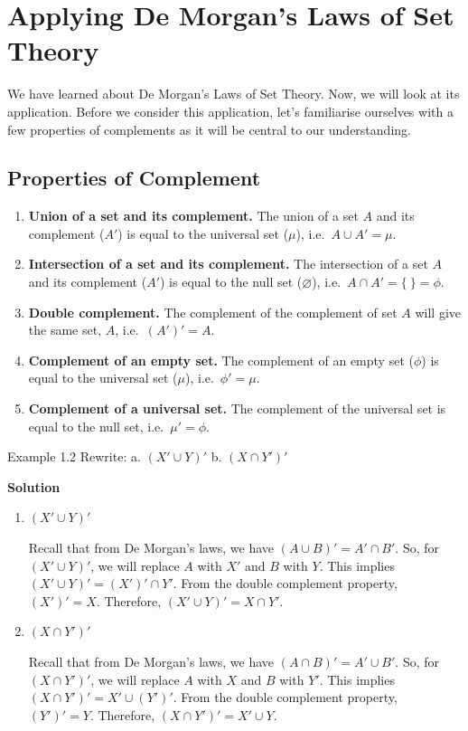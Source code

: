 \section{Applying De Morgan's Laws of Set Theory}

We have learned about De Morgan's Laws of Set Theory. Now, we will look at its
application. Before we consider this application, let's familiarise ourselves with a
few properties of complements as it will be central to our understanding.

\subsection*{Properties of Complement}
\begin{enumerate}
  \item \textbf{Union of a set and its complement.} The union of a set $A$ and its complement ($A'$) is equal to the universal set ($\mu$), i.e.\ $A \cup A' = \mu$.
  \item \textbf{Intersection of a set and its complement.} The intersection of a set $A$ and its complement ($A'$) is equal to the null set ($\varnothing$), i.e.\ $A \cap A' = \{\ \} = \phi$.
  \item \textbf{Double complement.} The complement of the complement of set $A$ will give the same set, $A$, i.e.\ $(A')' = A$.
  \item \textbf{Complement of an empty set.} The complement of an empty set ($\phi$) is equal to the universal set ($\mu$), i.e.\ $\phi' = \mu$.
  \item \textbf{Complement of a universal set.} The complement of the universal set is equal to the null set, i.e.\ $\mu' = \phi$.
\end{enumerate}

\begin{example}{Example 1.2}
Rewrite: \quad a. $(X' \cup Y)'$ \qquad b. $(X \cap Y')'$

\medskip\noindent\textbf{Solution}
\begin{enumerate}
  \item[a.] $(X' \cup Y)'$

  Recall that from De Morgan's laws, we have $(A \cup B)' = A' \cap B'$.
  So, for $(X' \cup Y)'$, we will replace $A$ with $X'$ and $B$ with $Y$.
  This implies $(X' \cup Y)' = (X')' \cap Y'$.
  From the double complement property, $(X')' = X$.
  Therefore, $(X' \cup Y)' = X \cap Y'$.

  \item[b.] $(X \cap Y')'$

  Recall that from De Morgan's laws, we have $(A \cap B)' = A' \cup B'$.
  So, for $(X \cap Y')'$, we will replace $A$ with $X$ and $B$ with $Y'$.
  This implies $(X \cap Y')' = X' \cup (Y')'$.
  From the double complement property, $(Y')' = Y$.
  Therefore, $(X \cap Y')' = X' \cup Y$.
\end{enumerate}
\end{example}

